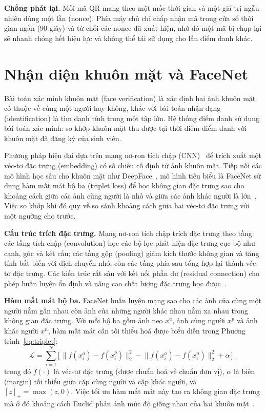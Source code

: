 \documentclass[../main.tex]{subfiles}
\begin{document}
\textbf{Chống phát lại.} Mỗi mã QR mang theo một mốc thời gian và một giá trị ngẫu nhiên dùng
một lần (nonce). Phía máy chủ chỉ chấp nhận mã trong cửa sổ thời gian ngắn (90 giây) và từ
chối các nonce đã xuất hiện, nhờ đó một mã bị chụp lại sẽ nhanh chóng hết hiệu lực và không
thể tái sử dụng cho lần điểm danh khác.

\section{Nhận diện khuôn mặt và FaceNet}
\label{sec:face-recognition}

Bài toán xác minh khuôn mặt (face verification) là xác định hai ảnh khuôn mặt có thuộc
về cùng một người hay không, khác với bài toán nhận dạng (identification) là tìm danh
tính trong một tập lớn. Hệ thống điểm danh sử dụng bài toán xác minh: so khớp khuôn mặt
thu được tại thời điểm điểm danh với khuôn mặt đã đăng ký của sinh viên.

Phương pháp hiện đại dựa trên mạng nơ-ron tích chập (CNN)~\cite{lecun1998gradient, he2016resnet}
để trích xuất một véc-tơ đặc trưng (embedding) có số chiều cố định từ ảnh khuôn mặt. Tiếp nối
các mô hình học sâu cho khuôn mặt như DeepFace~\cite{taigman2014deepface}, mô hình tiêu biểu là
FaceNet sử dụng hàm mất mát bộ ba (triplet loss) để học không gian đặc trưng sao cho khoảng
cách giữa các ảnh cùng người là nhỏ và giữa các ảnh khác người là lớn~\cite{schroff2015facenet}.
Việc so khớp khi đó quy về so sánh khoảng cách giữa hai véc-tơ đặc trưng với một ngưỡng
cho trước.

\textbf{Cấu trúc trích đặc trưng.} Mạng nơ-ron tích chập trích đặc trưng theo tầng: các tầng
tích chập (convolution) học các bộ lọc phát hiện đặc trưng cục bộ như cạnh, góc và kết cấu; các
tầng gộp (pooling) giảm kích thước không gian và tăng tính bất biến với dịch chuyển nhỏ; còn
các tầng phía sau tổng hợp lại thành véc-tơ đặc trưng. Các kiến trúc rất sâu với kết nối phần
dư (residual connection) cho phép huấn luyện ổn định và nâng cao chất lượng đặc trưng học
được~\cite{he2016resnet}.

\textbf{Hàm mất mát bộ ba.} FaceNet huấn luyện mạng sao cho các ảnh của cùng một người nằm gần
nhau còn ảnh của những người khác nhau nằm xa nhau trong không gian đặc trưng. Với mỗi bộ ba
gồm ảnh neo $x^a$, ảnh cùng người $x^p$ và ảnh khác người $x^n$, hàm mất mát cần tối thiểu hoá
được biểu diễn trong Phương trình~\ref{eq:triplet}:
\begin{equation}
\mathcal{L} = \sum_{i=1}^{N} \Big[\, \lVert f(x_i^a) - f(x_i^p) \rVert_2^2
- \lVert f(x_i^a) - f(x_i^n) \rVert_2^2 + \alpha \,\Big]_{+}
\label{eq:triplet}
\end{equation}
trong đó $f(\cdot)$ là véc-tơ đặc trưng (được chuẩn hoá về chuẩn đơn vị), $\alpha$ là biên
(margin) tối thiểu giữa cặp cùng người và cặp khác người, và $[z]_{+} = \max(z, 0)$. Việc tối
ưu hàm mất mát này tạo ra không gian đặc trưng mà ở đó khoảng cách Euclid phản ánh mức độ giống
nhau của hai khuôn mặt~\cite{schroff2015facenet}.
\end{document}
